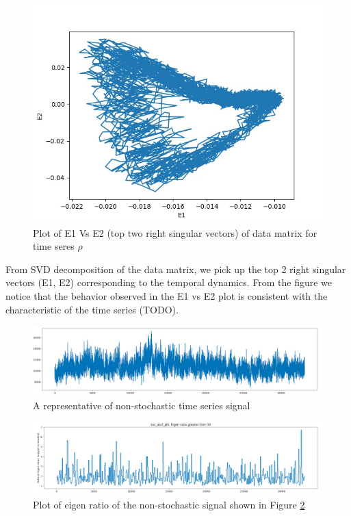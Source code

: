 \documentclass[10pt,conference]{IEEEtran}
\begin{document}
\begin{figure}[ht]
  \centering
  \includegraphics[width=\linewidth]{rho_svd.jpg}
  \caption{Plot of E1 Vs E2 (top two right singular vectors) of data matrix for  time seres $\rho$}
  \label{svd}
\end{figure}

From SVD decomposition of the data matrix, we pick up the top 2 right singular vectors (E1, E2) corresponding to the temporal dynamics.
From the figure we notice that the behavior observed in the E1 vs E2 plot is consistent with the characteristic of the time series (TODO).


\begin{figure}[ht]
  \centering
  \includegraphics[width=0.9\linewidth]{phi_ts.png}
  \caption{A representative of non-stochastic time series signal}
  \label{phi_ts}
  \end{figure}

\begin{figure}[ht]

  \centering
  \includegraphics[width=0.9\linewidth]{phi_ts_eig.png}
  \caption{Plot of eigen ratio of the non-stochastic signal shown in Figure \ref{phi_ts}}
  \label{phi_eig}
\end{figure}
\end{document}

